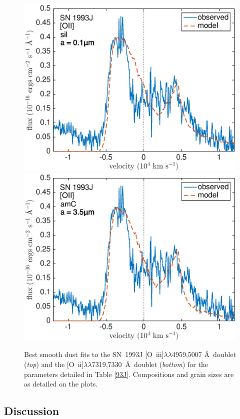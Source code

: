\begin{figure}[!t]
\includegraphics[scale=0.4,clip=true, trim=0 0 40 20]{chapters/chapter6/figs/93J/smooth/OII}
\includegraphics[scale=0.4,clip=true, trim=30 0 40 20]{chapters/chapter6/figs/93J/smooth/OII_amC}
\caption{Best smooth dust fits to the SN~1993J [O~{\sc iii}]$\lambda\lambda$4959,5007 \AA\ doublet ({\em top}) and the [O~{\sc ii}]$\lambda\lambda$7319,7330~\AA\ doublet ({\em bottom}) for the parameters detailed in Table \ref{93J}.  Compositions and grain sizes are as detailed on the plots.}
\label{93J_smooth}
\end{figure}



\subsection{Discussion}
\label{scn:discuss}

